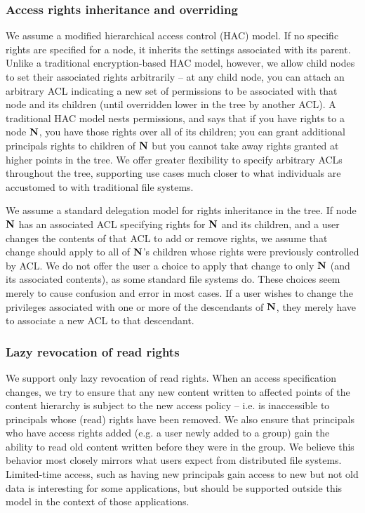 \subsubsection{Access rights inheritance and overriding}

We assume a modified hierarchical access control (HAC) model. If no
specific rights are specified for a node, it inherits the settings
associated with its parent. Unlike a traditional encryption-based HAC
model, however, we allow child nodes to set their associated rights
arbitrarily -- at any child node, you can attach an arbitrary ACL
indicating a new set of permissions to be associated with that node
and its children (until overridden lower in the tree by another
ACL). A traditional HAC model nests permissions, and says that if you
have rights to a node ${\textbf{N}}$, you have those rights over all of its
children; you can grant additional principals rights to children of
${\textbf{N}}$ but you cannot take away rights granted at higher points in the
tree. We offer greater flexibility to specify arbitrary ACLs
throughout the tree, supporting use cases much closer to what
individuals are accustomed to with traditional file systems.

We assume a standard delegation model for rights inheritance in the
tree. If node ${\textbf{N}}$ has an associated ACL specifying rights for ${\textbf{N}}$
and its children, and a user changes the contents of that ACL to add
or remove rights, we assume that change should apply to all of ${\textbf{N}}$'s
children whose rights were previously controlled by ACL. We do not
offer the user a choice to apply that change to only ${\textbf{N}}$ (and its
associated contents), as some standard file systems do. These choices
seem merely to cause confusion and error in most cases. If a user
wishes to change the privileges associated with one or more of the
descendants of ${\textbf{N}}$, they merely have to associate a new ACL to that
descendant.

\subsubsection{Lazy revocation of read rights}

We support only lazy revocation of read rights. When an access
specification changes, we try to ensure that any new content written
to affected points of the content hierarchy is subject to the new
access policy -- i.e. is inaccessible to principals whose (read)
rights have been removed. We also ensure that principals who have
access rights added (e.g. a user newly added to a group) gain the
ability to read old content written before they were in the group. We
believe this behavior most closely mirrors what users expect from
distributed file systems. Limited-time access, such as having new
principals gain access to new but not old data is interesting for some
applications, but should be supported outside this model in the
context of those applications.

